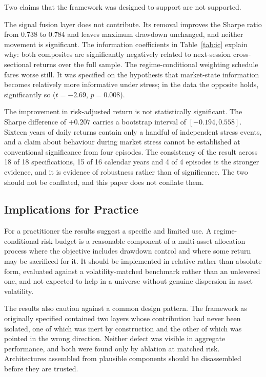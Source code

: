 \documentclass{singlecol-new}
\theoremstyle{TH}{
\newtheorem{lemma}{Lemma}
\newtheorem{theorem}[lemma]{Theorem}
\newtheorem{corrolary}[lemma]{Corrolary}
\newtheorem{conjecture}[lemma]{Conjecture}
\newtheorem{proposition}[lemma]{Proposition}
\newtheorem{claim}[lemma]{Claim}
\newtheorem{stheorem}[lemma]{Wrong Theorem}
\newtheorem{algorithm}{Algorithm}
}
\theoremstyle{THrm}{
\newtheorem{definition}{Definition}[section]
\newtheorem{question}{Question}[section]
\newtheorem{remark}{Remark}
\newtheorem{scheme}{Scheme}
}
\theoremstyle{THhit}{
\newtheorem{case}{Case}[section]
}
\begin{document}
Two claims that the framework was designed to support are not supported.

The signal fusion layer does not contribute. Its removal improves the Sharpe ratio from
0.738 to 0.784 and leaves maximum drawdown unchanged, and neither movement is
significant. The information coefficients in Table~\ref{tab:ic} explain why: both composites are
significantly negatively related to next-session cross-sectional returns over the full
sample. The regime-conditional weighting schedule fares worse still. It was specified on
the hypothesis that market-state information becomes relatively more informative under
stress; in the data the opposite holds, significantly so ($t = -2.69$, $p = 0.008$).

The improvement in risk-adjusted return is not statistically significant. The Sharpe
difference of $+0.207$ carries a bootstrap interval of $[-0.194, 0.558]$. Sixteen years
of daily returns contain only a handful of independent stress events, and a claim about
behaviour during market stress cannot be established at conventional significance from
four episodes. The consistency of the result across 18 of 18 specifications, 15 of 16
calendar years and 4 of 4 episodes is the stronger evidence, and it is evidence of
robustness rather than of significance. The two should not be conflated, and this paper
does not conflate them.

\subsection{Implications for Practice}

For a practitioner the results suggest a specific and limited use. A regime-conditional
risk budget is a reasonable component of a multi-asset allocation process where the
objective includes drawdown control and where some return may be sacrificed for it. It
should be implemented in relative rather than absolute form, evaluated against a
volatility-matched benchmark rather than an unlevered one, and not expected to help in
a universe without genuine dispersion in asset volatility.

The results also caution against a common design pattern. The framework as originally
specified contained two layers whose contribution had never been isolated, one of which
was inert by construction and the other of which was pointed in the wrong direction.
Neither defect was visible in aggregate performance, and both were found only by
ablation at matched risk. Architectures assembled from plausible components should be
disassembled before they are trusted.
\end{document}
